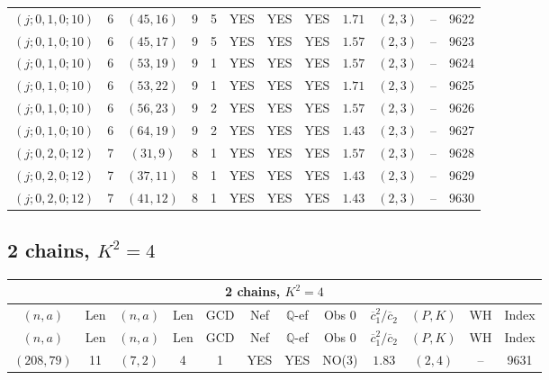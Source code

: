\begin{longtable}{|c|c|c|c|c|c|c|c|c|c|c|c|}
$(j;0,1,0;10)$ & 6 & $(45,16)$ & 9 & 5 & YES & YES & YES & $1.71$ & $(2,3)$ & -- & 9622\\
$(j;0,1,0;10)$ & 6 & $(45,17)$ & 9 & 5 & YES & YES & YES & $1.57$ & $(2,3)$ & -- & 9623\\
$(j;0,1,0;10)$ & 6 & $(53,19)$ & 9 & 1 & YES & YES & YES & $1.57$ & $(2,3)$ & -- & 9624\\
$(j;0,1,0;10)$ & 6 & $(53,22)$ & 9 & 1 & YES & YES & YES & $1.71$ & $(2,3)$ & -- & 9625\\
$(j;0,1,0;10)$ & 6 & $(56,23)$ & 9 & 2 & YES & YES & YES & $1.57$ & $(2,3)$ & -- & 9626\\
$(j;0,1,0;10)$ & 6 & $(64,19)$ & 9 & 2 & YES & YES & YES & $1.43$ & $(2,3)$ & -- & 9627\\
$(j;0,2,0;12)$ & 7 & $(31,9)$ & 8 & 1 & YES & YES & YES & $1.57$ & $(2,3)$ & -- & 9628\\
$(j;0,2,0;12)$ & 7 & $(37,11)$ & 8 & 1 & YES & YES & YES & $1.43$ & $(2,3)$ & -- & 9629\\
$(j;0,2,0;12)$ & 7 & $(41,12)$ & 8 & 1 & YES & YES & YES & $1.43$ & $(2,3)$ & -- & 9630
\end{longtable}
\subsection{2 chains, $K^2 = 4$}
\begin{longtable}{|c|c|c|c|c|c|c|c|c|c|c|c|}
\hline
\multicolumn{12}{|c|}{2 chains, $K^2 = 4$}\\
\hline
$(n,a)$ & Len & $(n,a)$ & Len & GCD & Nef & $\mathbb Q$-ef & Obs 0 & $\overline c_1^2 / \overline c_2$ & $(P,K)$ & WH & Index\\
\hline
\endfirsthead

\hline
$(n,a)$ & Len & $(n,a)$ & Len & GCD & Nef & $\mathbb Q$-ef & Obs 0 & $\overline c_1^2 / \overline c_2$ & $(P,K)$ & WH & Index\\
\hline
\endhead
\hline
\endfoot

$(208,79)$ & 11 & $(7,2)$ & 4 & 1 & YES & YES & NO(3) & $1.83$ & $(2,4)$ & -- & 9631
\end{longtable}
